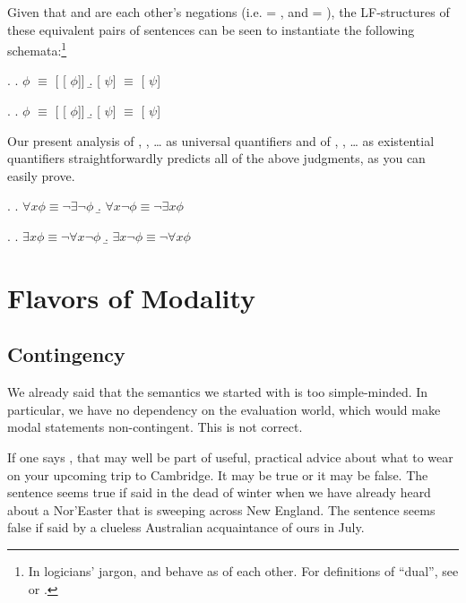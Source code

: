 Given that  and  are each other's negations (i.e.  = , and  = ), the LF-structures of these equivalent pairs of sentences can be seen to instantiate the following schemata:\footnote{In logicians' jargon,  and  behave as  of each other. For definitions of ``dual'', see \citet[197]{barwise-cooper:1981:generalized} or \citet[vol.2,238]{gamut:91}.}

\ex. \a.  $\phi$ $\equiv$  [ [ $\phi$]] \b.  [ \ensuremath{\psi}] $\equiv$  [ \ensuremath{\psi}]

\ex. \a.  $\phi$ $\equiv$  [ [ $\phi$]] \b.  [ \ensuremath{\psi}] $\equiv$  [ \ensuremath{\psi}]

\enlargethispage{12pt}
Our present analysis of , , \dots{} as universal quantifiers and of , , \dots{} as existential quantifiers straightforwardly predicts all of the above judgments, as you can easily prove.

\ex. \a. $\forall x \phi \equiv \neg \exists \neg \phi$ \b. $\forall x \neg \phi \equiv \neg \exists x \phi$

\ex. \a. $\exists x \phi \equiv \neg \forall x \neg \phi$ \b. $\exists x \neg \phi \equiv \neg \forall x \phi$

\section{Flavors of Modality} \label{sec:flavors}

\subsection{Contingency} \label{sec:contingency}

We already said that the semantics we started with is too simple-minded. In particular, we have no dependency on the evaluation world, which would make modal statements non-contingent. This is not correct.

If one says , that may well be part of useful, practical advice about what to wear on your upcoming trip to Cambridge. It may be true or it may be false. The sentence seems true if said in the dead of winter when we have already heard about a Nor'Easter that is sweeping across New England. The sentence seems false if said by a clueless Australian acquaintance of ours in July.

